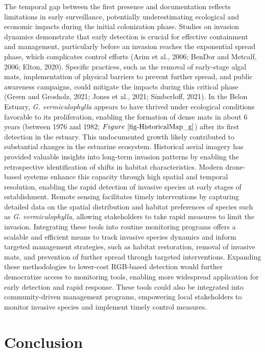 \documentclass[
  letterpaper,
  11pt,
  english,
  singlespacing,
  headsepline]{MastersDoctoralThesis}
\begin{document}
\begin{spacing}{1.5}
The temporal gap between the first presence and documentation reflects
limitations in early surveillance, potentially underestimating
ecological and economic impacts during the initial colonization phase.
Studies on invasion dynamics demonstrate that early detection is crucial
for effective containment and management, particularly before an
invasion reaches the exponential spread phase, which complicates control
efforts (Arim et al., 2006; BenDor and Metcalf, 2006; Elton, 2020).
Specific practices, such as the removal of early-stage algal mats,
implementation of physical barriers to prevent further spread, and
public awareness campaigns, could mitigate the impacts during this
critical phase (Green and Grosholz, 2021; Jones et al., 2021;
Simberloff, 2021). In the Belon Estuary, \emph{G. vermiculophylla}
appears to have thrived under ecological conditions favorable to its
proliferation, enabling the formation of dense mats in about 6 years
(between 1976 and 1982; \(Figure~\ref{fig-HistoricalMap_g}\)) after its
first detection in the estuary. This undocumented growth likely
contributed to substantial changes in the estuarine ecosystem.
Historical aerial imagery has provided valuable insights into long-term
invasion patterns by enabling the retrospective identification of shifts
in habitat characteristics. Modern drone-based systems enhance this
capacity through high spatial and temporal resolution, enabling the
rapid detection of invasive species at early stages of establishment.
Remote sensing facilitates timely interventions by capturing detailed
data on the spatial distribution and habitat preferences of species such
as \emph{G. vermiculophylla}, allowing stakeholders to take rapid
measures to limit the invasion. Integrating these tools into routine
monitoring programs offers a scalable and efficient means to track
invasive species dynamics and inform targeted management strategies,
such as habitat restoration, removal of invasive mats, and prevention of
further spread through targeted interventions. Expanding these
methodologies to lower-cost RGB-based detection would further
democratize access to monitoring tools, enabling more widespread
application for early detection and rapid response. These tools could
also be integrated into community-driven management programs, empowering
local stakeholders to monitor invasive species and implement timely
control measures.

\section{Conclusion}\label{conclusion-1}


\end{spacing}
\end{document}
